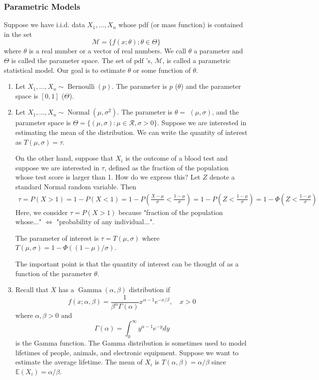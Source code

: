\documentclass[13pt]{article}
\theoremstyle{definition}
\theoremstyle{remark}
\newenvironment{remark}
  {\pushQED{\qed}\renewcommand{\qedsymbol}{$\triangle$}\remarkx}
  {\popQED\endremarkx}
\newcommand{\EE}{\mathbb{E}}
\begin{document}
\subsubsection{Parametric Models}
Suppose we have i.i.d. data $X_{1}, \ldots, X_{n}$ whose pdf (or mass function) is contained in the set
$$
\mathcal{M}=\{f(x ; \theta) ; \theta \in \Theta\}
$$
where $\theta$ is a real number or a vector of real numbers. We call $\theta$ a parameter and $\Theta$ is called the parameter space. The set of $\mathrm{pdf}$ 's, $\mathcal{M}$, is called a parametric statistical model. Our goal is to estimate $\theta$ or some function of $\theta$.

\begin{remark}\hfill 
    \begin{enumerate}
        \item Let $X_{1}, \ldots, X_{n} \sim \operatorname{Bernoulli}(p)$. The parameter is $p$ ($\theta$) and the parameter space is $[0,1]$ ($\Theta$).
        \item Let $X_{1}, \ldots, X_{n} \sim \operatorname{Normal}\left(\mu, \sigma^{2}\right)$. The parameter is $\theta=$ $(\mu, \sigma)$, and the parameter space is $\Theta=\{(\mu, \sigma): \mu \in \mathcal{R}, \sigma>0\}$. Suppose we are interested in estimating the mean of the distribution. We can write the quantity of interest as $T(\mu, \sigma)=\tau$. 
        
        On the other hand, suppose that $X_{i}$ is the outcome of a blood test and suppose we are interested in $\tau$, defined as the fraction of the population whose test score is larger than 1. How do we express this? Let $Z$ denote a standard Normal random variable. Then
$$
\begin{aligned}
\tau =P(X>1) =1-P(X<1) =1-P\left(\frac{X-\mu}{\sigma}<\frac{1-\mu}{\sigma}\right) =1-P\left(Z<\frac{1-\mu}{\sigma}\right) =1-\Phi\left(Z<\frac{1-\mu}{\sigma}\right)
\end{aligned}
$$
Here, we consider $\tau =P(X>1)$ because "fraction of the population whose..."  $\Longleftrightarrow$ "probability of any individual...".

The parameter of interest is $\tau=T(\mu, \sigma)$ where $T(\mu, \sigma)=1-\Phi((1-\mu) / \sigma)$. 

The important point is that the quantity of interest can be thought of as a function of the parameter $\theta$.
\item Recall that $X$ has a $\operatorname{Gamma}(\alpha, \beta)$ distribution if
$$
f(x ; \alpha, \beta)=\frac{1}{\beta^{\alpha} \Gamma(\alpha)} x^{\alpha-1} e^{-x / \beta}, \quad x>0
$$
where $\alpha, \beta>0$ and
$$
\Gamma(\alpha)=\int_{0}^{\infty} y^{\alpha-1} e^{-y} d y
$$
is the Gamma function. {\color{C4}The Gamma distribution is sometimes used to model lifetimes of people, animals, and electronic equipment.} Suppose we want to estimate the average lifetime. The mean of $X_{i}$ is $T(\alpha, \beta)=\alpha / \beta$ since $\EE(X_i)=\alpha / \beta$.
    \end{enumerate}
\end{remark}
\end{document}
